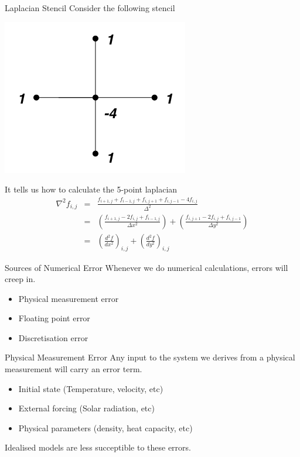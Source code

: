 \documentclass[a4paper]{beamer}
\begin{document}
\begin{frame}{Laplacian Stencil}
Consider the following stencil
\begin{center}
  \includegraphics[width=\textwidth,height=0.3\textheight,keepaspectratio]{stencil2.png}
\end{center}
It tells us how to calculate the 5-point laplacian
\begin{eqnarray}
\nabla^2 f_{i,j}  & = & \frac{f_{i+1,j} + f_{i-1,j} + f_{i,j+1} + f_{i,j-1} - 4f_{i,j}}{\Delta^2}\\
                  & = & \left(\frac{f_{i+1,j} - 2f_{i,j} + f_{i-1,j}}{\Delta x^2}\right) +\left(\frac{f_{i,j+1} - 2f_{i,j} + f_{i,j-1}}{\Delta y^2}\right)\\
                  & = & \left(\frac{d^2f}{dx^2}\right)_{i,j} + \left(\frac{d^2f}{dy^2}\right)_{i,j}
\end{eqnarray}
\end{frame}

\begin{frame}{Sources of Numerical Error}
Whenever we do numerical calculations, errors will creep in.
\begin{itemize}
\item Physical measurement error
\item Floating point error
\item Discretisation error
\end{itemize}
\end{frame}

\begin{frame}{Physical Measurement Error}
Any input to the system we derives from a physical measurement will carry an error term.
\begin{itemize}
\item Initial state (Temperature, velocity, etc)
\item External forcing (Solar radiation, etc)
\item Physical parameters (density, heat capacity, etc)
\end{itemize}
Idealised models are less succeptible to these errors.
\end{frame}
\end{document}
